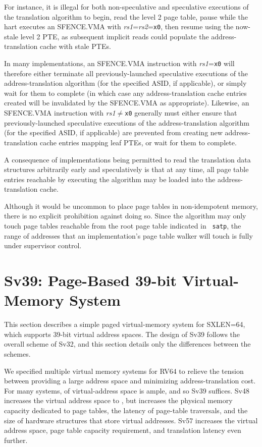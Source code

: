 \begin{commentary}
  For instance, it is illegal for both non-speculative and speculative
  executions of the translation algorithm to begin, read the level 2 page table,
  pause while the hart executes an SFENCE.VMA with {\em rs1}={\em rs2}={\tt x0},
  then resume using the now-stale level 2 PTE, as subsequent implicit reads
  could populate the address-translation cache with stale PTEs.

  In many implementations, an SFENCE.VMA instruction with {\em rs1}={\tt x0}
  will therefore either terminate all previously-launched speculative
  executions of the address-translation algorithm (for the specified ASID, if
  applicable), or simply wait for them to complete (in which case any
  address-translation cache entries created will be invalidated by the
  SFENCE.VMA as appropriate).  Likewise, an SFENCE.VMA instruction with {\em
  rs1}$\neq${\tt x0} generally must either ensure that previously-launched
  speculative executions of the address-translation algorithm (for the specified
  ASID, if applicable) are prevented from creating new address-translation cache
  entries mapping leaf PTEs, or wait for them to complete.

  A consequence of implementations being permitted to read the translation data
  structures arbitrarily early and speculatively is that at any time, all
  page table entries reachable by executing the algorithm may be loaded into
  the address-translation cache.

  Although it would be uncommon to place page tables in non-idempotent memory,
  there is no explicit prohibition against doing so.  Since the algorithm may
  only touch page tables reachable from the root page table indicated in {\tt
  satp}, the range of addresses that an implementation's page table walker will
  touch is fully under supervisor control.
\end{commentary}

\section{Sv39: Page-Based 39-bit Virtual-Memory System}
\label{sec:sv39}

This section describes a simple paged virtual-memory system
for SXLEN=64, which supports 39-bit virtual address spaces.  The
design of Sv39 follows the overall scheme of Sv32, and this section
details only the differences between the schemes.

\begin{commentary}
We specified multiple virtual memory systems for RV64 to relieve the tension
between providing a large address space and minimizing address-translation
cost.  For many systems,  of virtual-address space is ample,
and so Sv39 suffices.  Sv48 increases the virtual address space to
, but increases the physical memory
capacity dedicated to page tables, the latency of page-table traversals, and
the size of hardware structures that store virtual addresses.  Sv57 increases
the virtual address space, page table capacity requirement, and translation
latency even further.
\end{commentary}

